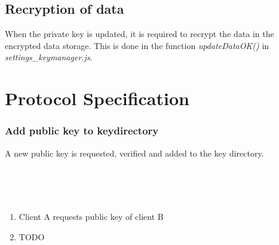 \documentclass{scrartcl}
\begin{document}
\subsection{Recryption of data}
When the private key is updated, it is required to recrypt the data in the encrypted data storage. This is done in the function \textit{updateDataOK()} in \textit{settings\_keymanager.js}.


\section{Protocol Specification}
\subsubsection{Add public key to keydirectory}
A new public key is requested, verified and added to the key directory.
\\\\
\\\\

\begin{enumerate}
\item Client A requests public key of client B
\item TODO
\end{enumerate}
\end{document}
